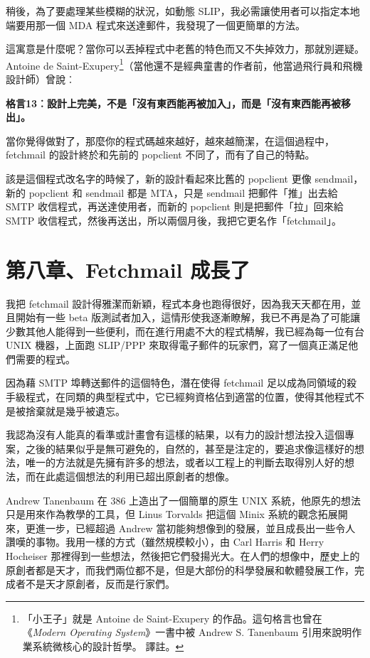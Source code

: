 \documentclass[10pt, b5paper]{book}
\makeatletter
\newcommand*{\shifttext}[2]{%
  \settowidth{\@tempdima}{#2}%
  \makebox[\@tempdima]{\hspace*{#1}#2}%
}
\makeatother
\begin{document}
稍後，為了要處理某些模糊的狀況，如動態
SLIP，我必需讓使用者可以指定本地端要用那一個 MDA
程式來送達郵件，我發現了一個更簡單的方法。

這寓意是什麼呢？當你可以丟掉程式中老舊的特色而又不失掉效力，那就別遲疑。Antoine
de Saint-Exupery\footnote{「小王子」就是 Antoine de Saint-Exupery
  的作品。這句格言也曾在《\emph{Modern Operating System}》一書中被
  Andrew S. Tanenbaum 引用來說明作業系統微核心的設計哲學。 \shifttext{1pt}{---}\shifttext{-1pt}{---} 譯註。}（當他還不是經典童書的作者前，他當過飛行員和飛機設計師）曾說︰

\textbf{格言13︰設計上完美，不是「沒有東西能再被加入」，而是「沒有東西能再被移出」。}

當你覺得做對了，那麼你的程式碼越來越好，越來越簡潔，在這個過程中，fetchmail
的設計終於和先前的 popclient 不同了，而有了自己的特點。

該是這個程式改名字的時候了，新的設計看起來比舊的 popclient 更像
sendmail，新的 popclient 和 sendmail 都是 MTA，只是 sendmail
把郵件「推」出去給 SMTP 收信程式，再送達使用者，而新的 popclient
則是把郵件「拉」回來給 SMTP
收信程式，然後再送出，所以兩個月後，我把它更名作「fetchmail」。

\newpage
\section{第八章、Fetchmail 成長了}

我把 fetchmail
設計得雅潔而新穎，程式本身也跑得很好，因為我天天都在用，並且開始有一些 beta
版測試者加入，這情形使我逐漸瞭解，我已不再是為了可能讓少數其他人能得到一些便利，而在進行用處不大的程式棈解，我已經為每一位有台
UNIX 機器，上面跑 SLIP/PPP
來取得電子郵件的玩家們，寫了一個真正滿足他們需要的程式。

因為藉 SMTP 埠轉送郵件的這個特色，潛在使得 fetchmail
足以成為同領域的殺手級程式，在同類的典型程式中，它已經夠資格佔到適當的位置，使得其他程式不是被捨棄就是幾乎被遺忘。

我認為沒有人能真的看準或計畫會有這樣的結果，以有力的設計想法投入這個專案，之後的結果似乎是無可避免的，自然的，甚至是注定的，要追求像這樣好的想法，唯一的方法就是先擁有許多的想法，或者以工程上的判斷去取得別人好的想法，而在此處這個想法的利用已超出原創者的想像。

Andrew Tanenbaum 在 386 上造出了一個簡單的原生 UNIX
系統，他原先的想法只是用來作為教學的工具，但 Linus Torvalds 把這個 Minix
系統的觀念拓展開來，更進一步，已經超過 Andrew
當初能夠想像到的發展，並且成長出一些令人讚嘆的事物。我用一樣的方式（雖然規模較小），由
Carl Harris 和 Herry Hocheiser
那裡得到一些想法，然後把它們發揚光大。在人們的想像中，歷史上的原創者都是天才，而我們兩位都不是，但是大部份的科學發展和軟體發展工作，完成者不是天才原創者，反而是行家們。
\end{document}
